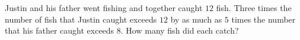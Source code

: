 Justin and his father went fishing and together caught $12$ fish. Three times the number of fish that Justin caught exceeds $12$ by as much as $5$ times the number that his father caught exceeds $8$. How many fish did each catch?
